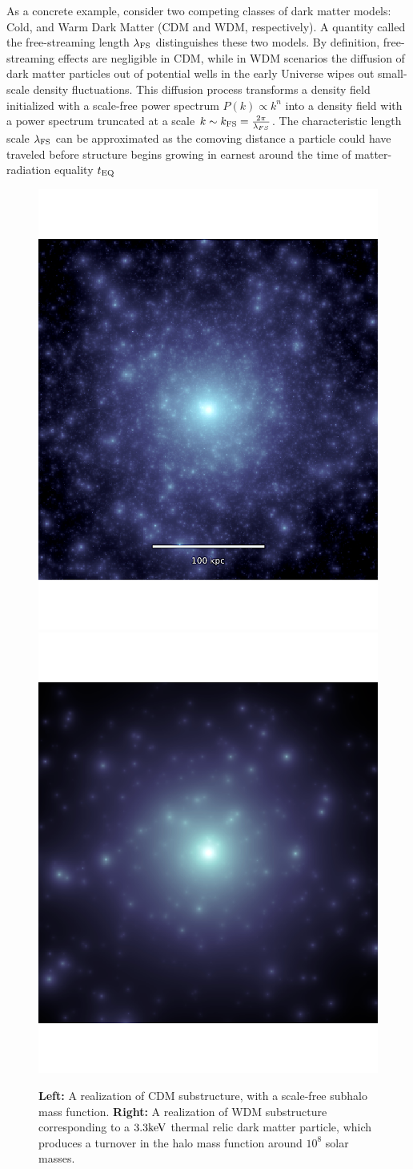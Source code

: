 As a concrete example, consider two competing classes of dark matter models: Cold, and Warm Dark Matter (CDM and WDM, respectively). A quantity called the free-streaming length $\lambda_{\rm{FS}}$ distinguishes these two models. By definition, free-streaming effects are negligible in CDM, while in WDM scenarios the diffusion of dark matter particles out of potential wells in the early Universe wipes out small-scale density fluctuations. This diffusion process transforms a density field initialized with a scale-free power spectrum $P\left(k\right) \propto k^{n}$ into a density field with a power spectrum truncated at a scale $k \sim k_{\rm{FS}} = \frac{2 \pi}{\lambda_{FS}}$. The characteristic length scale $\lambda_{\rm{FS}}$ can be approximated as the comoving distance a particle could have traveled before structure begins growing in earnest around the time of matter-radiation equality $t_{\rm{EQ}}$ \citep{Schneider++12} 
\begin{figure}
	\centering
	\includegraphics[clip,trim=0cm 0cm 0cm
	0cm,width=.49\textwidth,keepaspectratio]{./figures_introduction/CDMscreenshot_edited.pdf}
	\includegraphics[clip,trim=0cm 0cm 0cm
	0cm,width=.49\textwidth,keepaspectratio]{./figures_introduction/WDMrealization_nobar.pdf}
	\caption[CDM and WDM subhalo populations]{\label{fig:wdmrealization} {\bf{Left:}} A realization of CDM substructure, with a scale-free subhalo mass function. {\bf{Right:}} A realization of WDM substructure corresponding to a $3.3 \rm{keV}$ thermal relic dark matter particle, which produces a turnover in the halo mass function around $10^8$ solar masses. }
\end{figure}


